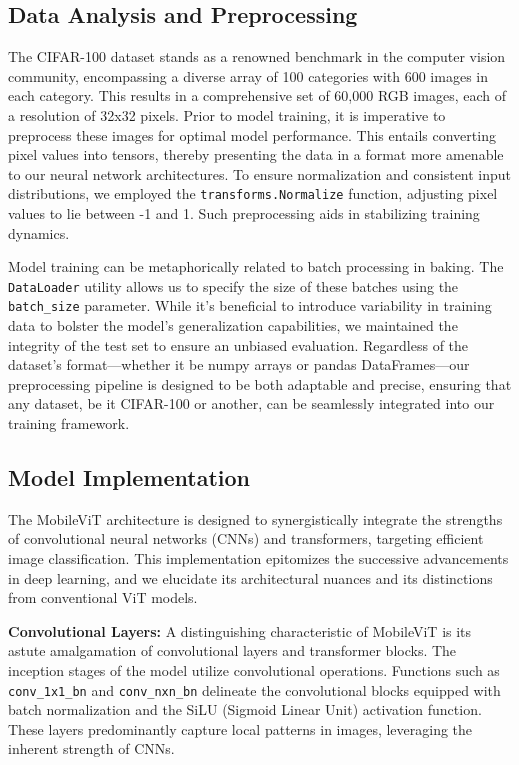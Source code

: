 \documentclass[10pt,twocolumn,letterpaper]{article}
\begin{document}
\subsection{Data Analysis and Preprocessing}

The CIFAR-100 dataset stands as a renowned benchmark in the computer vision community, encompassing a diverse array of 100 categories with 600 images in each category. This results in a comprehensive set of 60,000 RGB images, each of a resolution of 32x32 pixels. Prior to model training, it is imperative to preprocess these images for optimal model performance. This entails converting pixel values into tensors, thereby presenting the data in a format more amenable to our neural network architectures. To ensure normalization and consistent input distributions, we employed the \texttt{transforms.Normalize} function, adjusting pixel values to lie between -1 and 1. Such preprocessing aids in stabilizing training dynamics.

Model training can be metaphorically related to batch processing in baking. The \texttt{DataLoader} utility allows us to specify the size of these batches using the \texttt{batch\_size} parameter. While it's beneficial to introduce variability in training data to bolster the model's generalization capabilities, we maintained the integrity of the test set to ensure an unbiased evaluation. Regardless of the dataset's format—whether it be numpy arrays or pandas DataFrames—our preprocessing pipeline is designed to be both adaptable and precise, ensuring that any dataset, be it CIFAR-100 or another, can be seamlessly integrated into our training framework.

\subsection{Model Implementation}

The MobileViT architecture is designed to synergistically integrate the strengths of convolutional neural networks (CNNs) and transformers, targeting efficient image classification. This implementation epitomizes the successive advancements in deep learning, and we elucidate its architectural nuances and its distinctions from conventional ViT models.

\textbf{Convolutional Layers:}
A distinguishing characteristic of MobileViT is its astute amalgamation of convolutional layers and transformer blocks. The inception stages of the model utilize convolutional operations. Functions such as \texttt{conv\_1x1\_bn} and \texttt{conv\_nxn\_bn} delineate the convolutional blocks equipped with batch normalization and the SiLU (Sigmoid Linear Unit) activation function. These layers predominantly capture local patterns in images, leveraging the inherent strength of CNNs.
\end{document}
